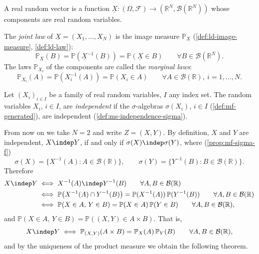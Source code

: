 \begin{definition}\label{def:pm-random-vector-alt}
A real random vector is a function
$\underline X:(\Omega,\mathcal F)\to(\mathbb R^N,\mathcal B(\mathbb R^N))$ whose components
are real random variables.
\end{definition}

\begin{definition}\label{def:pm-joint-law}
The \emph{joint law} of $\underline X=(X_1,\dots,X_N)$ is the image measure
$\mathbb P_{\underline X}$ (\cref{def:ld-image-measure}, \cref{def:ld-law}):
\[
  \mathbb P_{\underline X}(B)=\mathbb P(\underline X^{-1}(B))=\mathbb P(\underline X\in B)
  \qquad\forall B\in\mathcal B(\mathbb R^N).
\]
The laws $\mathbb P_{X_i}$ of the components are called the \emph{marginal laws}:
\[
  \mathbb P_{X_i}(A)=\mathbb P(X_i^{-1}(A))=\mathbb P(X_i\in A)\qquad\forall A\in\mathcal B(\mathbb R),\
  i=1,\dots,N .
\]
\end{definition}

\begin{definition}\label{def:pm-independent}
Let $(X_i)_{i\in I}$ be a family of real random variables, $I$ any index set. The random
variables $X_i$, $i\in I$, are \emph{independent} if the $\sigma$-algebras $\sigma(X_i)$,
$i\in I$ (\cref{def:mf-generated}), are independent (\cref{def:ms-independence-sigma}).
\end{definition}

From now on we take $N=2$ and write $Z=(X,Y)$. By definition, $X$ and $Y$ are independent,
$X\indep Y$, if and only if $\sigma(X)\indep\sigma(Y)$, where (\cref{prop:mf-sigma-f})
\[
  \sigma(X)=\{X^{-1}(A):A\in\mathcal B(\mathbb R)\},\qquad
  \sigma(Y)=\{Y^{-1}(B):B\in\mathcal B(\mathbb R)\}.
\]
Therefore
\[
\begin{aligned}
  X\indep Y&\iff X^{-1}(A)\indep Y^{-1}(B)\qquad\forall A,B\in\mathcal B(\mathbb R)\\
  &\iff\mathbb P\big(X^{-1}(A)\cap Y^{-1}(B)\big)=\mathbb P(X^{-1}(A))\,\mathbb P(Y^{-1}(B))
    \qquad\forall A,B\in\mathcal B(\mathbb R)\\
  &\iff\mathbb P(X\in A,\,Y\in B)=\mathbb P(X\in A)\,\mathbb P(Y\in B)
    \qquad\forall A,B\in\mathcal B(\mathbb R),
\end{aligned}
\]
and $\mathbb P(X\in A,\,Y\in B)=\mathbb P((X,Y)\in A\times B)$. That is,
\begin{equation}\label{eq:pm-rectangles}
  X\indep Y\iff\mathbb P_{(X,Y)}(A\times B)=\mathbb P_X(A)\,\mathbb P_Y(B)\qquad
  \forall A,B\in\mathcal B(\mathbb R),
\end{equation}
and by the uniqueness of the product measure we obtain the following theorem.

